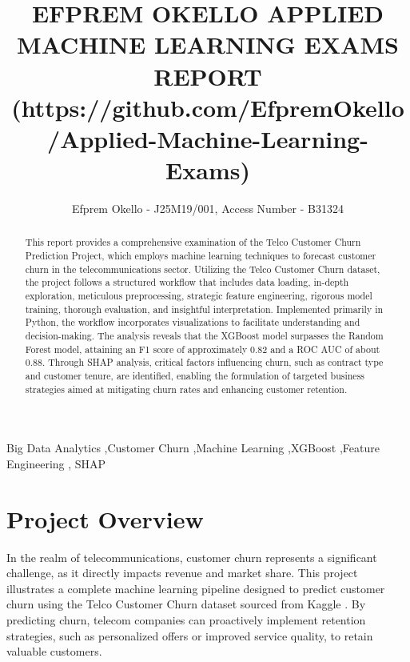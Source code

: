 \documentclass[preprint, 3p,
authoryear]{elsarticle} %
\begin{document}
\begin{frontmatter}

  \title{EFPREM OKELLO APPLIED MACHINE LEARNING EXAMS REPORT
(https://github.com/EfpremOkello/Applied-Machine-Learning-Exams)}
    \author[Uganda Christian University]{Efprem Okello - J25M19/001,
Access Number - B31324%
  }
  
  \begin{abstract}
  This report provides a comprehensive examination of the Telco Customer
  Churn Prediction Project, which employs machine learning techniques to
  forecast customer churn in the telecommunications sector. Utilizing
  the Telco Customer Churn dataset, the project follows a structured
  workflow that includes data loading, in-depth exploration, meticulous
  preprocessing, strategic feature engineering, rigorous model training,
  thorough evaluation, and insightful interpretation. Implemented
  primarily in Python, the workflow incorporates visualizations to
  facilitate understanding and decision-making. The analysis reveals
  that the XGBoost model surpasses the Random Forest model, attaining an
  F1 score of approximately 0.82 and a ROC AUC of about 0.88. Through
  SHAP analysis, critical factors influencing churn, such as contract
  type and customer tenure, are identified, enabling the formulation of
  targeted business strategies aimed at mitigating churn rates and
  enhancing customer retention.
  \end{abstract}
    \begin{keyword}
    Big Data Analytics \sep Customer Churn \sep Machine
Learning \sep XGBoost \sep Feature Engineering \sep 
    SHAP
  \end{keyword}
  
 \end{frontmatter}

\section{Project Overview}\label{project-overview}

In the realm of telecommunications, customer churn represents a
significant challenge, as it directly impacts revenue and market share.
This project illustrates a complete machine learning pipeline designed
to predict customer churn using the Telco Customer Churn dataset sourced
from Kaggle \citep{kanaan2014doing}. By predicting churn, telecom
companies can proactively implement retention strategies, such as
personalized offers or improved service quality, to retain valuable
customers.
\end{document}
